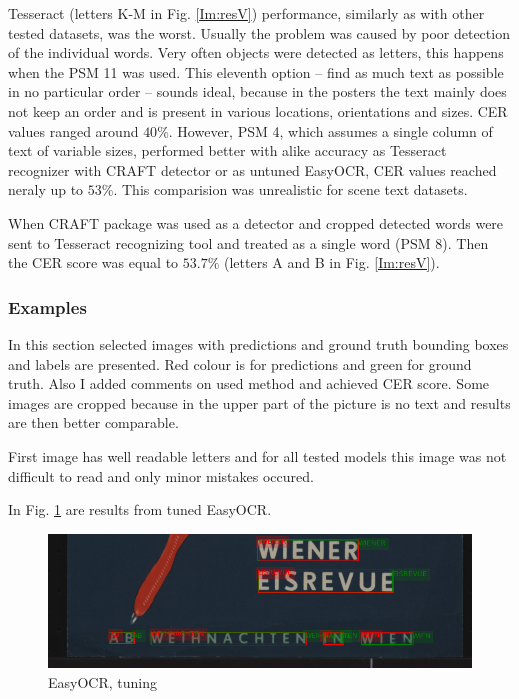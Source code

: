 Tesseract (letters K-M in Fig. \ref*{Im:resV}) performance, similarly as with other tested datasets, was the worst. Usually the problem was caused by poor detection of the individual words. Very often objects were detected as letters, this happens when the PSM 11 was used. This eleventh option --  find as much text as possible in no particular order -- sounds ideal, because in the posters the text mainly does not keep an order and is present in various locations, orientations and sizes. CER values ranged around $40\%$. However, PSM 4, which assumes a single column of text of variable sizes, performed better with alike accuracy as Tesseract recognizer with CRAFT detector or as untuned EasyOCR, CER values reached neraly up to $53\%$. This comparision was unrealistic for scene text datasets.

When CRAFT package was used as a detector and cropped detected words were sent to Tesseract recognizing tool and treated as a single word (PSM 8). Then the CER score was equal to $53.7\%$ (letters A and B in Fig. \ref*{Im:resV}).

\subsubsection*{Examples}

In this section selected images with predictions and ground truth bounding boxes and labels are presented. Red colour is for predictions and green for ground truth. Also I added comments on used method and achieved CER score. Some images are cropped because in the upper part of the picture is no text and results are then better comparable.


First image %
has well readable letters and for all tested models this image was not difficult to read and only minor mistakes occured.

In Fig. \ref{Im2:ex:easy} are results from tuned EasyOCR. 

\begin{figure}[hbtp!]
    \centering
    \includegraphics[scale=0.36]{obrazky/plakaty/result_easyOCR_vienna1_split_tuning_special_sensitive-21.png}
    \caption{EasyOCR, tuning}
    \label{Im2:ex:easy}
\end{figure}

